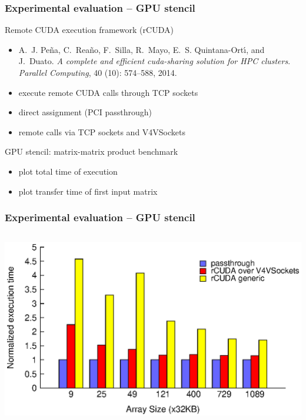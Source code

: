 \documentclass[red,slidestop,notes,compress,mathserif]{beamer}
\begin{document}
\begin{frame}

\frametitle{Experimental evaluation -- GPU stencil}
\begin{block}{Remote CUDA execution framework (rCUDA)}
\begin{itemize}
\item A.~J. Pe{\~{n}}a, C.~Rea{\~{n}}o, F.~Silla, R.~Mayo, E.~S.
  Quintana{-}Ort{\'{\i}}, and J.~Duato.
\emph{A complete and efficient cuda-sharing solution for {HPC} clusters}.
\emph{Parallel Computing}, 40 (10): 574--588, 2014.
\item execute remote CUDA calls through TCP sockets
\item direct assignment (PCI passthrough)
\item remote calls via TCP sockets and V4VSockets
\end{itemize}
\end{block}

\begin{block}{GPU stencil: matrix-matrix product benchmark}
\begin{itemize}
\item plot total time of execution
\item plot transfer time of first input matrix
\end{itemize}
\end{block}
\end{frame}


\begin{frame}
\frametitle{Experimental evaluation -- GPU stencil}
\begin{columns}
\includegraphics[width=\textwidth]{figures/total_cublas_time.eps}
\end{columns}
\end{frame}
\end{document}
